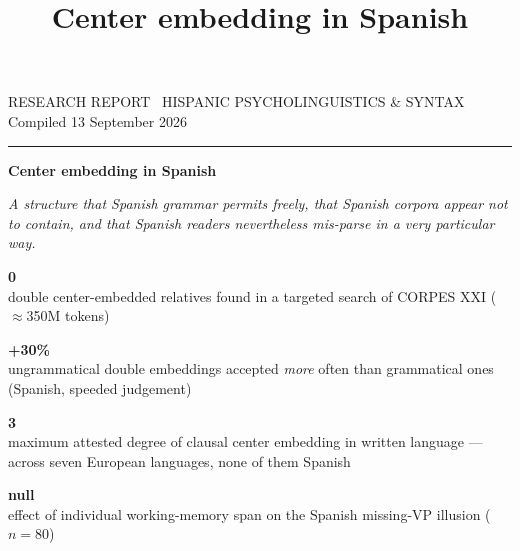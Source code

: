 \documentclass[11pt, a4paper]{article}
\title{\vspace{-2.5em}\Huge\bfseries Center embedding in Spanish}
\author{}
\date{}
\begin{document}

\begingroup
\noindent
{\ttfamily\small\color{oxblood}\MakeUppercase{Research report \textperiodcentered\ Hispanic psycholinguistics \& syntax}}
\hfill
{\ttfamily\small\color{midgray}Compiled 13 September 2026}\par
\vspace{0.6em}
\noindent\rule{\linewidth}{1.4pt}\par
\vspace{0.5em}
{\huge\bfseries Center embedding in Spanish\par}
\vspace{0.6em}
{\Large\itshape\color{midgray} A structure that Spanish grammar permits freely, that Spanish corpora appear not to contain, and that Spanish readers nevertheless mis-parse in a very particular way.\par}
\vspace{1.2em}
\endgroup

\noindent
\begin{tcolorbox}[
  colback=panelgray, colframe=rulegray, boxrule=0.4pt, arc=0pt,
  left=8pt, right=8pt, top=8pt, bottom=8pt, breakable
]
\begin{minipage}[t]{0.24\linewidth}
  \RaggedRight
  {\Large\bfseries\color{oxblood}0}\\[4pt]
  {\footnotesize\ttfamily double center-embedded relatives found in a targeted search of CORPES XXI ($\approx$350M tokens)}
\end{minipage}\hfill
\begin{minipage}[t]{0.24\linewidth}
  \RaggedRight
  {\Large\bfseries\color{oxblood}+30\%}\\[4pt]
  {\footnotesize\ttfamily ungrammatical double embeddings accepted \emph{more} often than grammatical ones (Spanish, speeded judgement)}
\end{minipage}\hfill
\begin{minipage}[t]{0.24\linewidth}
  \RaggedRight
  {\Large\bfseries\color{oxblood}3}\\[4pt]
  {\footnotesize\ttfamily maximum attested degree of clausal center embedding in written language --- across seven European languages, none of them Spanish}
\end{minipage}\hfill
\begin{minipage}[t]{0.24\linewidth}
  \RaggedRight
  {\Large\bfseries\color{oxblood}null}\\[4pt]
  {\footnotesize\ttfamily effect of individual working-memory span on the Spanish missing-VP illusion ($n=80$)}
\end{minipage}
\end{tcolorbox}
\vspace{1.5em}
\end{document}
